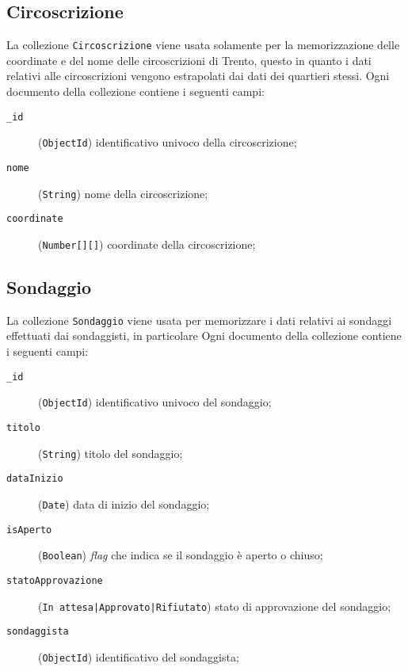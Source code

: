     \subsection{Circoscrizione}
        La collezione \texttt{Circoscrizione} viene usata solamente per la memorizzazione delle coordinate e del nome delle circoscrizioni di Trento, questo in quanto i dati relativi alle circoscrizioni vengono estrapolati dai dati dei quartieri stessi. Ogni documento della collezione contiene i seguenti campi:
        \begin{description}
            \item[\texttt{\_id}] (\texttt{ObjectId}) identificativo univoco della circoscrizione;
            \item[\texttt{nome}] (\texttt{String}) nome della circoscrizione;
            \item[\texttt{coordinate}] (\texttt{Number[][]}) coordinate della circoscrizione;
        \end{description}
    \subsection{Sondaggio}
        La collezione \texttt{Sondaggio} viene usata per memorizzare i dati relativi ai sondaggi effettuati dai sondaggisti, in particolare 
        Ogni documento della collezione contiene i seguenti campi:
        \begin{description}
            \item[\texttt{\_id}] (\texttt{ObjectId}) identificativo univoco del sondaggio;
            \item[\texttt{titolo}] (\texttt{String}) titolo del sondaggio;
            \item[\texttt{dataInizio}] (\texttt{Date}) data di inizio del sondaggio;
            \item[\texttt{isAperto}] (\texttt{Boolean}) \textit{flag} che indica se il sondaggio è aperto o chiuso;
            \item[\texttt{statoApprovazione}] (\texttt{In attesa|Approvato|Rifiutato}) stato di approvazione del sondaggio;
            \item[\texttt{sondaggista}] (\texttt{ObjectId}) identificativo del sondaggista;
        \end{description}
